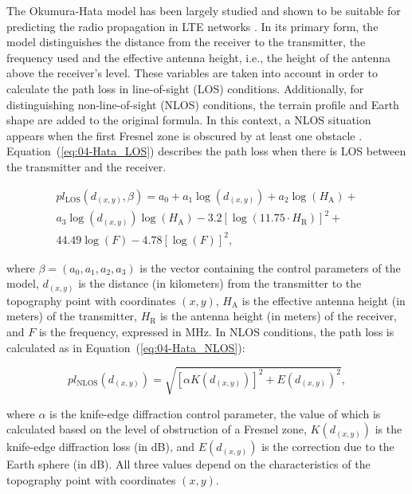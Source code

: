 The Okumura-Hata model has been largely studied and shown to be suitable
for predicting the radio propagation in LTE networks \cite{Ahmad:Studying_different_propagation_models_for_LTE_system:2012,Shabbir_Comparison_of_radio_propagation_models:2011}.
In its primary form, the model distinguishes the distance from the
receiver to the transmitter, the frequency used and the effective
antenna height, i.e., the height of the antenna above the receiver's
level. These variables are taken into account in order to calculate
the path loss in line-of-sight (LOS) conditions. Additionally, for
distinguishing non-line-of-sight (NLOS) conditions, the terrain profile
and Earth shape are added to the original formula. In this context,
a NLOS situation appears when the first Fresnel zone is obscured by
at least one obstacle \cite{Xia-Radio_propagation_characteristics_for_line_of_sight_microcellular_and_personal_communications:1993}.
Equation~(\ref{eq:04-Hata_LOS}) describes the path loss when there
is LOS between the transmitter and the receiver.

\begin{multline}
pl_{\mathrm{LOS}}(d_{(x,y)},\beta)=a_{0}+a_{1}\log(d_{(x,y)})+a_{2}\log(H_{\mathrm{A}})+\\
a_{3}\log(d_{(x,y)})\log(H_{\mathrm{A}})-3.2\left[\log(11.75\cdot H_{\mathrm{R}})\right]^{2}+\\
44.49\log(F)-4.78\left[\log(F)\right]^{2},\label{eq:04-Hata_LOS}
\end{multline}


\noindent where $\beta=(a_{0},a_{1},a_{2},a_{3})$ is the vector containing
the control parameters of the model, $d_{(x,y)}$ is the distance
(in kilometers) from the transmitter to the topography point with
coordinates $(x,y)$, $H_{\mathrm{A}}$ is the effective antenna height
(in meters) of the transmitter, $H_{\mathrm{R}}$ is the antenna height
(in meters) of the receiver, and $F$ is the frequency, expressed
in MHz. In NLOS conditions, the path loss is calculated as in Equation~(\ref{eq:04-Hata_NLOS}):

\begin{equation}
pl_{\mathrm{NLOS}}(d_{(x,y)})=\sqrt{\left[\alpha K(d_{(x,y)})\right]^{2}+E(d_{(x,y)})^{2}},\label{eq:04-Hata_NLOS}
\end{equation}


\noindent where $\alpha$ is the knife-edge diffraction control parameter,
the value of which is calculated based on the level of obstruction
of a Fresnel zone, $K(d_{(x,y)})$ is the knife-edge diffraction loss
(in dB), and $E(d_{(x,y)})$ is the correction due to the Earth sphere
(in dB). All three values depend on the characteristics of the topography
point with coordinates $(x,y)$.

